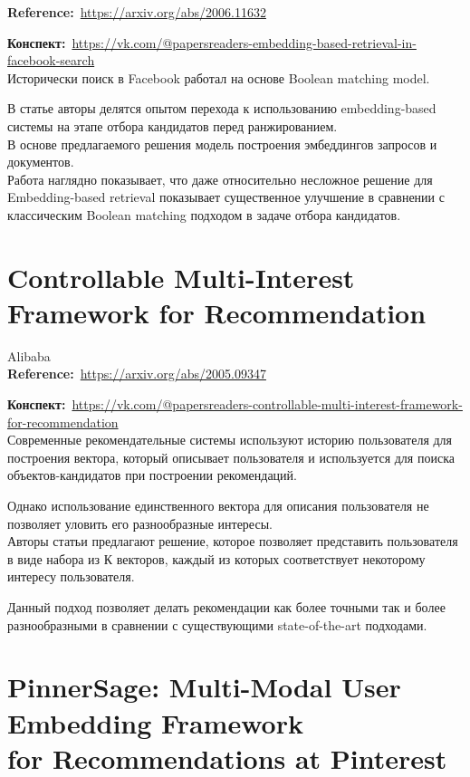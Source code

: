 \begin{bibunit}[plainnat]
\textbf{Reference:}~\url{https://arxiv.org/abs/2006.11632}

\textbf{Конспект:}~\url{https://vk.com/@papersreaders-embedding-based-retrieval-in-facebook-search} \\

Исторически поиск в Facebook работал на основе Boolean matching model.

В статье авторы делятся опытом перехода к использованию embedding-based системы на этапе отбора кандидатов перед ранжированием. \\

В основе предлагаемого решения модель построения эмбеддингов запросов и документов. \\

Работа наглядно показывает, что даже относительно несложное решение для Embedding-based retrieval показывает существенное улучшение в сравнении с классическим Boolean matching подходом в задаче отбора кандидатов.

\section{Controllable Multi-Interest Framework for Recommendation}

Alibaba \\

\textbf{Reference:}~\url{https://arxiv.org/abs/2005.09347}

\textbf{Конспект:}~\url{https://vk.com/@papersreaders-controllable-multi-interest-framework-for-recommendation} \\

Современные рекомендательные системы используют историю пользователя для построения вектора, который описывает пользователя и используется для поиска объектов-кандидатов при построении рекомендаций. 

Однако использование единственного вектора для описания пользователя не позволяет уловить его разнообразные интересы. \\

Авторы статьи предлагают решение, которое позволяет представить пользователя в виде набора из К векторов, каждый из которых соответствует некоторому интересу пользователя.

Данный подход позволяет делать рекомендации как более точными так и более разнообразными в сравнении с существующими state-of-the-art подходами.

\section{PinnerSage: Multi-Modal User Embedding Framework \\ for Recommendations at Pinterest}


\end{bibunit}

